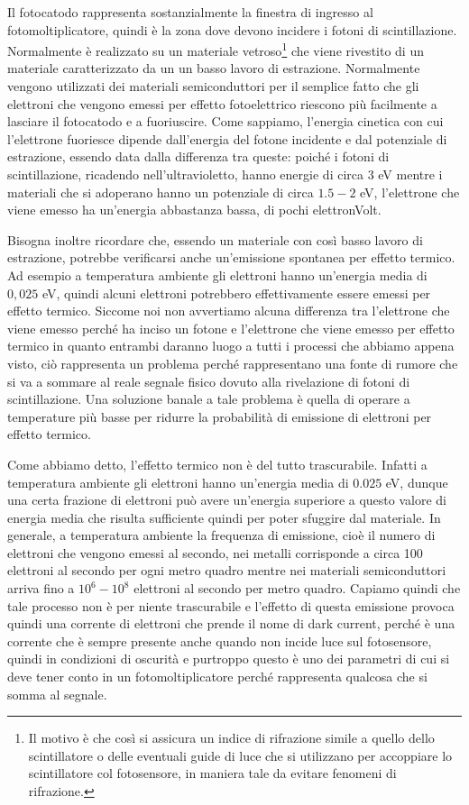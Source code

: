 Il fotocatodo rappresenta sostanzialmente la finestra di ingresso al fotomoltiplicatore, quindi è la zona dove devono incidere i fotoni di scintillazione. Normalmente è realizzato su un materiale vetroso\footnote{Il motivo è che così si assicura un indice di rifrazione simile a quello dello scintillatore o delle eventuali guide di luce che si utilizzano per accoppiare lo scintillatore col fotosensore, in maniera tale da evitare fenomeni di rifrazione.} che viene rivestito di un materiale caratterizzato da un un basso lavoro di estrazione. Normalmente vengono utilizzati dei materiali semiconduttori per il semplice fatto che gli elettroni che vengono emessi per effetto fotoelettrico riescono più facilmente a lasciare il fotocatodo e a fuoriuscire. Come sappiamo, l'energia cinetica con cui l'elettrone fuoriesce dipende dall'energia del fotone incidente e dal potenziale di estrazione, essendo data dalla differenza tra queste: poiché i fotoni di scintillazione, ricadendo nell'ultravioletto, hanno energie di circa 3 eV mentre i materiali che si adoperano hanno un potenziale di circa $1.5-2$ eV, l'elettrone che viene emesso ha un'energia abbastanza bassa, di pochi elettronVolt.

Bisogna inoltre ricordare che, essendo un materiale con così basso lavoro di estrazione, potrebbe verificarsi anche un'emissione spontanea per effetto termico. Ad esempio a temperatura ambiente gli elettroni hanno un'energia media di $0,025$ eV, quindi alcuni elettroni potrebbero effettivamente essere emessi per effetto termico. Siccome noi non avvertiamo alcuna differenza tra l'elettrone che viene emesso perché ha inciso un fotone e l'elettrone che viene emesso per effetto termico in quanto entrambi daranno luogo a tutti i processi che abbiamo appena visto, ciò rappresenta un problema perché rappresentano una fonte di rumore che si va a sommare al reale segnale fisico dovuto alla rivelazione di fotoni di scintillazione. Una soluzione banale a tale problema è quella di operare a temperature più basse per ridurre la probabilità di emissione di elettroni per effetto termico.

Come abbiamo detto, l'effetto termico non è del tutto trascurabile. Infatti a temperatura ambiente gli elettroni hanno un'energia media di $0.025$ eV, dunque una certa frazione di elettroni può avere un'energia superiore a questo valore di energia media che risulta sufficiente quindi per poter sfuggire dal materiale. In generale, a temperatura ambiente la frequenza di emissione, cioè il numero di elettroni che vengono emessi al secondo, nei metalli corrisponde a circa 100 elettroni al secondo per ogni metro quadro mentre nei materiali semiconduttori arriva fino a $10^6-10^8$ elettroni al secondo per metro quadro. Capiamo quindi che tale processo non è per niente trascurabile e l'effetto di questa emissione provoca quindi una corrente di elettroni che prende il nome di dark current, perché è una corrente che è sempre presente anche quando non incide luce sul fotosensore, quindi in condizioni di oscurità e purtroppo questo è uno dei parametri di cui si deve tener conto in un fotomoltiplicatore perché rappresenta qualcosa che si somma al segnale.

